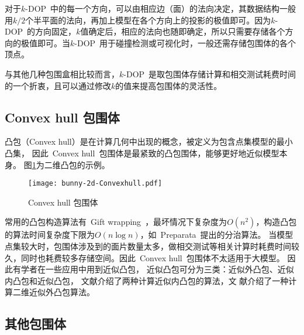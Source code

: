 对于$k$-DOP~中的每一个方向，可以由相应边（面）的法向决定，其数据结构一般用$k/2$个半平面的法向，再加上模型在各个方向上的投影的极值即可。因为$k$-DOP~的方向固定，$k$值确定后，相应的法向也随即确定，所以只需要存储各个方向的极值即可。当$k$-DOP~用于碰撞检测或可视化时，一般还需存储包围体的各个顶点。

与其他几种包围盒相比较而言，$k$-DOP~是取包围体存储计算和相交测试耗费时间的一个折衷，且可以通过修改$k$的值来提高包围体的灵活性。

\subsection{Convex hull 包围体}

凸包（Convex hull）是在计算几何中出现的概念，被定义为包含点集模型的最小凸集\cite{dengcg}，
因此~Convex
hull~包围体是最紧致的凸包围体，能够更好地近似模型本身。
图\ref{fig:convexhull-bunny}为二维凸包的示例。

\begin{figure}[H] %
  \centering
  \texttt{[image: bunny-2d-Convexhull.pdf]}
  \caption{Convex hull 包围体}
  \label{fig:convexhull-bunny}
\end{figure}

常用的凸包构造算法有~Gift wrapping~\cite{Chand1970An}，最坏情况下复杂度为$O(n^2)$，构造凸包的算法时间复杂度下限为$O(n\log n)$，如~Preparata~提出的分治算法\cite{Preparata1977}。
当模型点集较大时，包围体涉及到的面片数量太多，做相交测试等相关计算时耗费时间较久，同时也耗费较多存储空间。因此~Convex hull~包围体不太适用于大模型。
因此有学者在一些应用中用到近似凸包，
近似凸包可分为三类：近似外凸包、近似内凸包和近似凸包\cite{hossain2013constructing}，
文献介绍了两种计算近似内凸包的算法，文
献介绍了一种计算二维近似外凸包算法。

\subsection{其他包围体}

